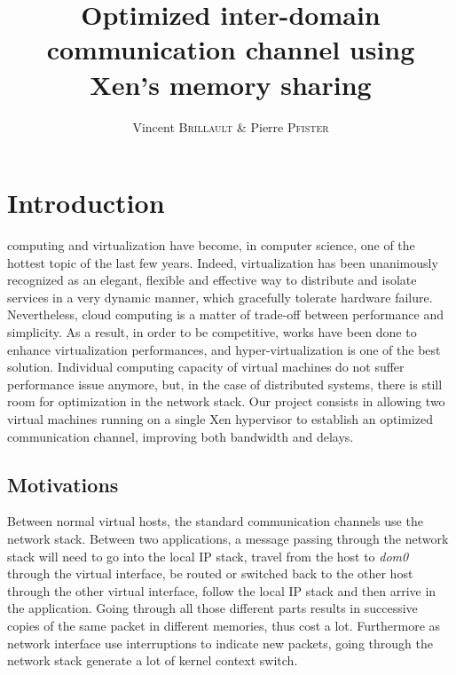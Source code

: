 \documentclass[journal]{IEEEtran}
\begin{document}
\title{Optimized inter-domain communication channel using Xen's memory sharing}

\author{Vincent B\textsc{rillault} \& Pierre P\textsc{fister}}%

\maketitle

\begin{abstract}






\end{abstract}

\section{Introduction}

 computing and virtualization have become, in computer science, one of the hottest topic of the last few years.
Indeed, virtualization has been unanimously recognized as an elegant, flexible and effective way to distribute and isolate services in a very dynamic manner, which gracefully tolerate hardware failure.
Nevertheless, cloud computing is a matter of trade-off between performance and simplicity.
As a result, in order to be competitive, works have been done to enhance virtualization performances, and hyper-virtualization is one of the best solution.
Individual computing capacity of virtual machines do not suffer performance issue anymore, but, in the case of distributed systems, there is still room for optimization in the network stack.
Our project consists in allowing two virtual machines running on a single Xen hypervisor to establish an optimized communication channel, improving both bandwidth and delays.

\subsection{Motivations}

Between normal virtual hosts, the standard communication channels use the network stack.
Between two applications, a message passing through the network stack will need to go into the local IP stack, travel from the host to \emph{dom0} through the virtual interface, be routed or switched back to the other host through the other virtual interface, follow the local IP stack and then arrive in the application.
Going through all those different parts results in successive copies of the same packet in different memories, thus cost a lot.
Furthermore as network interface use interruptions to indicate new packets, going through the network stack generate a lot of kernel context switch.
\end{document}
